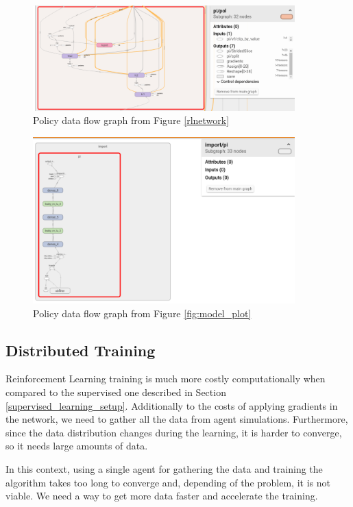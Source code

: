 \begin{figure}[!htbp]
	\centering
	\includegraphics[width=0.9\textwidth]{Cap5/policygraph1.eps}
	\caption{ Policy data flow graph from Figure \ref{rlnetwork}
	}
	\label{fig:policygraph1}
\end{figure}

\begin{figure}[!htbp]
	\centering
	\includegraphics[width=0.9\textwidth]{Cap5/policygraph2.eps}
	\caption{ Policy data flow graph from Figure \ref{fig:model_plot}
	}
	\label{fig:policygraph2}
\end{figure}


\subsection{Distributed Training}\label{sec:distributedtraining}
Reinforcement Learning training is much more costly computationally when compared to the supervised one described in Section \ref{supervised_learning_setup}. Additionally to the costs of applying gradients in the network, we need to gather all the data from agent simulations. Furthermore, since the data distribution changes during the learning, it is harder to converge, so it needs large amounts of data.

In this context, using a single agent for gathering the data and training the algorithm takes too long to converge and, depending of the problem, it is not viable. We need a way to get more data faster and accelerate the training.

